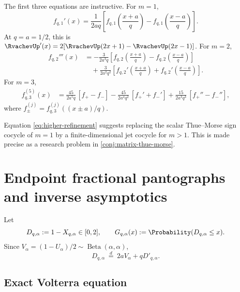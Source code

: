 \documentclass[11pt]{article}
\theoremstyle{definition}
\theoremstyle{remark}
\begin{document}
The first three equations are instructive.  For \(m=1\),
\begin{equation}
 f_{q,1}'(x)=\frac1{2aq}
 \left[f_{q,1}\left(\frac{x+a}{q}\right)
 -f_{q,1}\left(\frac{x-a}{q}\right)\right].
 \label{eq:m1-refinement}
\end{equation}
At \(q=a=1/2\), this is
\(\RvachevUp'(x)=2[\RvachevUp(2x+1)-\RvachevUp(2x-1)]\).
For \(m=2\),
\begin{equation}
\begin{aligned}
 f_{q,2}'''(x)
 &=-\frac{3}{2a^3q}
 \left[f_{q,2}\left(\frac{x+a}{q}\right)
 -f_{q,2}\left(\frac{x-a}{q}\right)\right]\\
 &\quad+\frac{3}{2a^2q^2}
 \left[f_{q,2}'\left(\frac{x+a}{q}\right)
 +f_{q,2}'\left(\frac{x-a}{q}\right)\right].
 \label{eq:m2-refinement}
\end{aligned}
\end{equation}
For \(m=3\),
\begin{equation}
\begin{aligned}
 f_{q,3}^{(5)}(x)
 &=\frac{45}{2a^5q}\,[f_+-f_-]
 -\frac{45}{2a^4q^2}\,[f_+'+f_-']
 +\frac{15}{2a^3q^3}\,[f_+''-f_-''],
 \label{eq:m3-refinement}
\end{aligned}
\end{equation}
where \(f_\pm^{(j)}=f_{q,3}^{(j)}((x\pm a)/q)\).

Equation \eqref{eq:higher-refinement} suggests replacing the scalar
Thue--Morse sign cocycle of \(m=1\) by a finite-dimensional jet cocycle for
\(m>1\).  This is made precise as a research problem in
\cref{conj:matrix-thue-morse}.

\section{Endpoint fractional pantographs and inverse asymptotics}
\label{sec:endpoint}

Let
\begin{equation}
 D_{q,\alpha}:=1-X_{q,\alpha}\in[0,2],
 \qquad
 G_{q,\alpha}(x):=\Probability(D_{q,\alpha}\le x).
 \label{eq:endpoint-def}
\end{equation}
Since \(V_\alpha=(1-U_\alpha)/2\sim\operatorname{Beta}(\alpha,\alpha)\),
\begin{equation}
 D_{q,\alpha}\ \overset d=\ 2aV_\alpha+qD'_{q,\alpha}.
 \label{eq:endpoint-fixed-point}
\end{equation}

\subsection{Exact Volterra equation}
\end{document}
